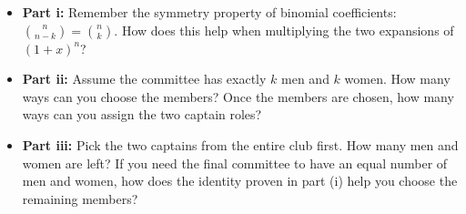 \begin{hint}
  \begin{itemize}[leftmargin=*]
      \item \textbf{Part i:} Remember the symmetry property of binomial coefficients: $\binom{n}{n-k} = \binom{n}{k}$. How does this help when multiplying the two expansions of $(1+x)^n$?
      \item \textbf{Part ii:} Assume the committee has exactly $k$ men and $k$ women. How many ways can you choose the members? Once the members are chosen, how many ways can you assign the two captain roles?
      \item \textbf{Part iii:} Pick the two captains from the entire club first. How many men and women are left? If you need the final committee to have an equal number of men and women, how does the identity proven in part (i) help you choose the remaining members?
  \end{itemize}
\end{hint}

